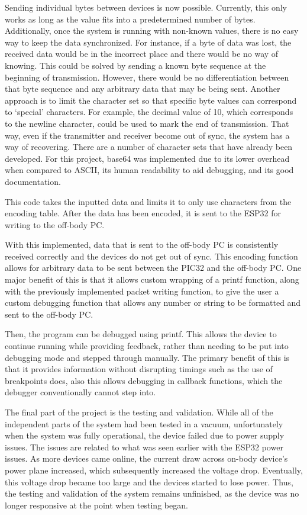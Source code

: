Sending individual bytes between devices is now possible.
Currently, this only works as long as the value fits into a predetermined number of bytes.
Additionally, once the system is running with non-known values, there is no easy way to keep the data synchronized.
For instance, if a byte of data was lost, the received data would be in the incorrect place
and there would be no way of knowing.
This could be solved by sending a known byte sequence at the beginning of transmission.
However, there would be no differentiation between that byte sequence and any arbitrary data that may be being sent.
Another approach is to limit the character set so that specific byte values can correspond to `special' characters.
For example, the decimal value of 10, which corresponds to the newline character, could be used to mark the end of transmission.
That way, even if the transmitter and receiver become out of sync, the system has a way of recovering.
There are a number of character sets that have already been developed.
For this project, base64 was implemented due to its lower overhead when compared to ASCII, its human readability to aid debugging, and its good documentation.

This code takes the inputted data and limits it to only use characters from the encoding table.
After the data has been encoded, it is sent to the ESP32 for writing to the off-body PC.

With this implemented, data that is sent to the off-body PC is consistently received correctly and the devices do not get out of sync.
This encoding function allows for arbitrary data to be sent between the PIC32 and the off-body PC.
One major benefit of this is that it allows custom wrapping of a printf function, along with the previously implemented packet writing function,
to give the user a custom debugging function that allows any number or string to be formatted and sent to the off-body PC.

Then, the program can be debugged using printf.
This allows the device to continue running while providing feedback, rather than needing to be put into debugging mode and stepped through manually.
The primary benefit of this is that it provides information without disrupting timings such as the use of breakpoints does, also this allows debugging in callback functions,
which the debugger conventionally cannot step into.

The final part of the project is the testing and validation.
While all of the independent parts of the system had been tested in a vacuum,
unfortunately when the system was fully operational, the device failed due to power supply issues.
The issues are related to what was seen earlier with the ESP32 power issues.
As more devices came online, the current draw across on-body device's power plane increased, which subsequently increased the voltage drop.
Eventually, this voltage drop became too large and the devices started to lose power.
Thus, the testing and validation of the system remains unfinished, as the device was no longer responsive at the point when testing began.
